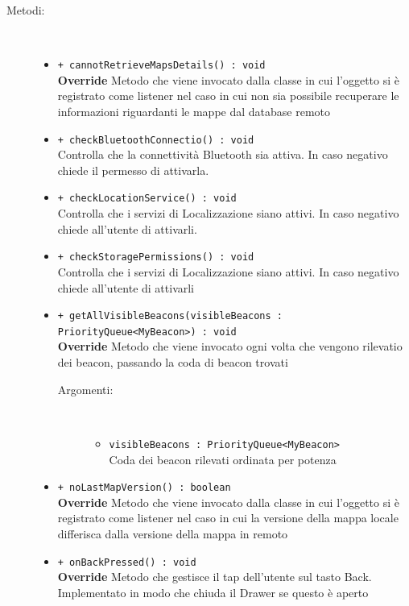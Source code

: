 \documentclass[../DefinizioneDiProdotto.tex]{subfiles}
\begin{document}
\begin{description}
\begin{itemize}
	\end{itemize}
	\item[Metodi:] \
	\begin{itemize}
		\item \texttt{+ cannotRetrieveMapsDetails() : void}\\
		\textbf{Override} Metodo che viene invocato dalla classe in cui l'oggetto si è registrato come listener nel caso in cui non sia possibile recuperare le informazioni riguardanti le mappe dal database remoto
		\item \texttt{+ checkBluetoothConnectio() : void}\\
		Controlla che la connettività Bluetooth sia attiva. In caso negativo chiede il permesso di attivarla.
		\item \texttt{+ checkLocationService() : void}\\
		Controlla che i servizi di Localizzazione siano attivi. In caso negativo chiede all'utente di attivarli.
		\item \texttt{+ checkStoragePermissions() : void}\\
		Controlla che i servizi di Localizzazione siano attivi. In caso negativo chiede all'utente di attivarli
		\item \texttt{+ getAllVisibleBeacons(visibleBeacons : PriorityQueue<MyBeacon>) : void}\\
		\textbf{Override} Metodo che viene invocato ogni volta che vengono rilevatio dei beacon, passando la coda di beacon trovati
		\begin{description}
			\item[Argomenti:] \
			\begin{itemize}
				\item \texttt{visibleBeacons : PriorityQueue<MyBeacon>}\\
				Coda dei beacon rilevati ordinata per potenza\end{itemize}
		\end{description}
		\item \texttt{+ noLastMapVersion() : boolean}\\
		\textbf{Override} Metodo che viene invocato dalla classe in cui l'oggetto si è registrato come listener nel caso in cui la versione della mappa locale differisca dalla versione della mappa in remoto
		\item \texttt{+ onBackPressed() : void}\\
		\textbf{Override} Metodo che gestisce il tap dell'utente sul tasto Back. Implementato in modo che chiuda il Drawer se questo è aperto

\end{itemize}
\end{description}
\end{document}
